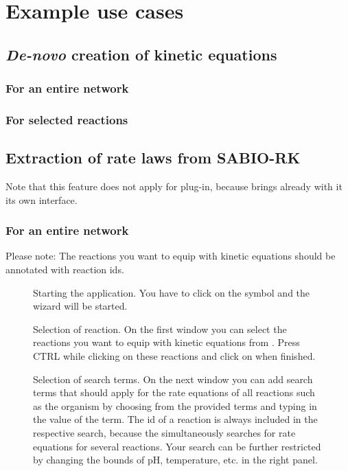 \chapter{Example use cases}

\section{\emph{De-novo} creation of kinetic equations}
\subsection{For an entire network}
\subsection{For selected reactions}
\section{Extraction of rate laws from SABIO-RK}

Note that this feature does not apply for \CellDesigner plug-in,
because \CellDesigner brings already with it its own \SABIO interface.

\subsection{For an entire network}
Please note: The reactions you want to equip with kinetic equations should be annotated with \KEGG reaction ids.

\begin{figure}[htbp]
\caption{Starting the \SABIO application.
You have to click on the \SABIO symbol and the wizard will be started.}
\label{fig:startAutomatic}
\end{figure}

\begin{figure}[htbp]
\caption{Selection of reaction.
On the first window you can select the reactions you want to equip with kinetic equations from \SABIO. 
Press CTRL%
while clicking on these reactions and click on  when finished.}
\label{fig:selectReations}
\end{figure}

\begin{figure}[htbp]
\caption{Selection of search terms. On the next window you can add search terms
that should apply for the rate equations of all reactions such as the organism
by choosing from the provided terms and typing in the value of the term.
The \KEGG id of a reaction is always included in the respective search,
because the \API simultaneously searches for rate equations for several reactions.
Your search can be further restricted by changing the bounds of pH, temperature,
etc. in the right panel.}
\label{fig:searchTerms}
\end{figure}

